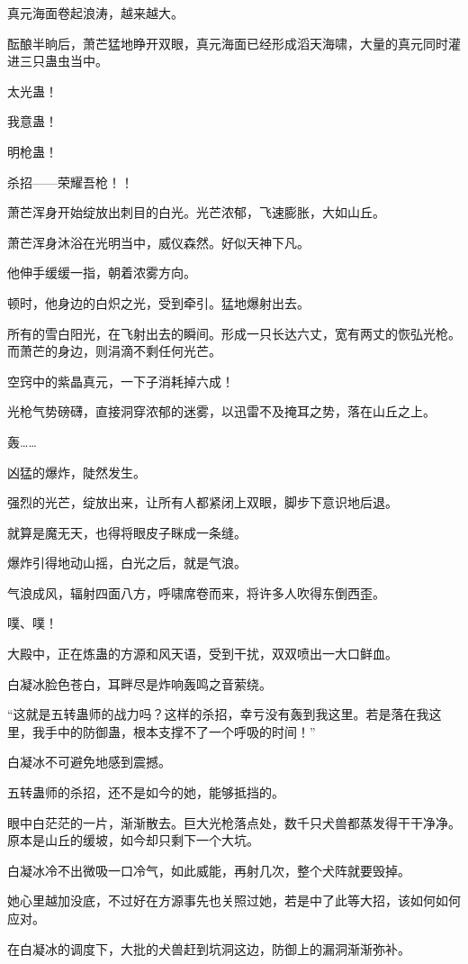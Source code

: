 \begin{this_body}
真元海面卷起浪涛，越来越大。

酝酿半晌后，萧芒猛地睁开双眼，真元海面已经形成滔天海啸，大量的真元同时灌进三只蛊虫当中。

太光蛊！

我意蛊！

明枪蛊！

杀招——荣耀吾枪！！

萧芒浑身开始绽放出刺目的白光。光芒浓郁，飞速膨胀，大如山丘。

萧芒浑身沐浴在光明当中，威仪森然。好似天神下凡。

他伸手缓缓一指，朝着浓雾方向。

顿时，他身边的白炽之光，受到牵引。猛地爆射出去。

所有的雪白阳光，在飞射出去的瞬间。形成一只长达六丈，宽有两丈的恢弘光枪。而萧芒的身边，则涓滴不剩任何光芒。

空窍中的紫晶真元，一下子消耗掉六成！

光枪气势磅礴，直接洞穿浓郁的迷雾，以迅雷不及掩耳之势，落在山丘之上。

轰……

凶猛的爆炸，陡然发生。

强烈的光芒，绽放出来，让所有人都紧闭上双眼，脚步下意识地后退。

就算是魔无天，也得将眼皮子眯成一条缝。

爆炸引得地动山摇，白光之后，就是气浪。

气浪成风，辐射四面八方，呼啸席卷而来，将许多人吹得东倒西歪。

噗、噗！

大殿中，正在炼蛊的方源和风天语，受到干扰，双双喷出一大口鲜血。

白凝冰脸色苍白，耳畔尽是炸响轰鸣之音萦绕。

“这就是五转蛊师的战力吗？这样的杀招，幸亏没有轰到我这里。若是落在我这里，我手中的防御蛊，根本支撑不了一个呼吸的时间！”

白凝冰不可避免地感到震撼。

五转蛊师的杀招，还不是如今的她，能够抵挡的。

眼中白茫茫的一片，渐渐散去。巨大光枪落点处，数千只犬兽都蒸发得干干净净。原本是山丘的缓坡，如今却只剩下一个大坑。

白凝冰冷不出微吸一口冷气，如此威能，再射几次，整个犬阵就要毁掉。

她心里越加没底，不过好在方源事先也关照过她，若是中了此等大招，该如何如何应对。

在白凝冰的调度下，大批的犬兽赶到坑洞这边，防御上的漏洞渐渐弥补。


\end{this_body}
